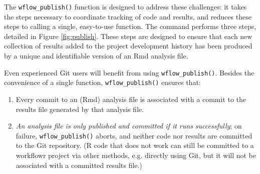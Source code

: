 \documentclass[9pt,a4paper]{extarticle}
\begin{document}
The \texttt{wflow\_publish()} function is designed to address these challenges: it
takes the steps necessary to coordinate tracking of code and results,
and reduces these steps to calling a single, easy-to-use function. The
command performs three steps, detailed in Figure \ref{fig:publish}. These steps are
designed to ensure that each new collection of results added to the
project development history has been produced by a unique and
identifiable version of an Rmd analysis file.

Even experienced Git users will benefit from using \texttt{wflow\_publish()}.
Besides the convenience of a single function, \texttt{wflow\_publish()} ensures
that:

\begin{enumerate}

\item Every commit to an (Rmd) analysis file is associated with a commit
to the results file generated by that analysis file.

\item \textit{An analysis file is only published and committed if it
runs successfully}; on failure, \texttt{wflow\_publish()} aborts, and neither code
nor results are committed to the Git repository. (R code that does not
work can still be committed to a workflowr project via other methods,
e.g. directly using Git, but it will not be associated with a committed
results file.)

\end{enumerate}
\end{document}
